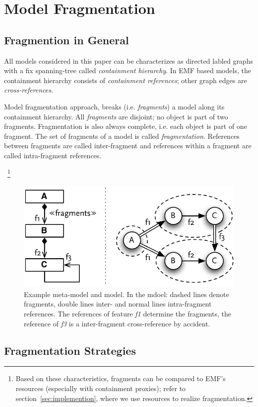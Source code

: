 \section{Model Fragmentation}
\label{sec:fragmentation}

\subsection{Fragmention in General}
All models considered in this paper can be characterizes as directed labled graphs with a fix spanning-tree called \emph{containment hierarchy}. In EMF based models, the containment hierarchy consists of \emph{containment references}; other graph edges are \emph{cross-references}. 

Model fragmentation approach, breaks (i.e. \emph{fragments}) a model along its containment hierarchy. All \emph{fragments} are disjoint; no object is part of two fragments. Fragmentation is also always complete, i.e. each object is part of one fragment. The set of fragments of a model is called \emph{fragmentation}. References between fragments are called inter-fragment and references within a fragment are called intra-fragment references.

~\footnote{Based on these characteristics, fragments can be compared to EMF's resources (especially with containment proxies); refer to section~\ref{sec:implemention}, where we use resources to realize fragmentation.} 

\begin{figure}[ht]
\centering
\includegraphics[width=0.65\linewidth]{figures/fragmentationExplained}
\caption{Example meta-model and model. In the mdoel: dashed lines denote fragments, double lines inter- and normal lines intra-fragment references. The references of feature \emph{f1} determine the fragments, the reference of \emph{f3} is a inter-fragment cross-reference by accident.}
\label{fig:metamodelFragmentation}
\end{figure}  

\subsection{Fragmentation Strategies}

